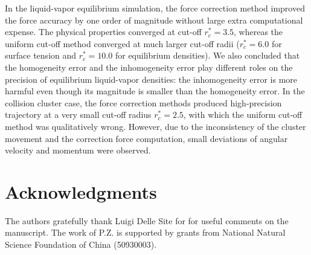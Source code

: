\documentclass[aps,pre,preprint]{revtex4}
\newcommand{\recheck}[1]{{\color{red} #1}}
\begin{document}
In the liquid-vapor equilibrium simulation, the
force correction method improved the force accuracy by one order of
magnitude without large extra computational expense. The physical
properties converged at cut-off $r_c^\ast = 3.5$, whereas the uniform
cut-off method converged at much larger cut-off radii ($r_c^\ast = 6.0$
for surface tension and $r_c^\ast = 10.0$ for equilibrium
densities).
\recheck{
We also concluded that the homogeneity
error and the inhomogeneity error play different roles on the precision
of equilibrium liquid-vapor densities: the inhomogeneity error
is more harmful even though its magnitude is smaller than the homogeneity
error.}
In the collision cluster case,
the force correction methods produced high-precision trajectory at a
very small cut-off radius $r_c^\ast=2.5$, with which the uniform
cut-off method was qualitatively wrong. However, due to the
inconsistency of the cluster movement and the correction force
computation, small deviations of angular velocity and momentum were
observed.



\section*{Acknowledgments}
The authors gratefully thank Luigi Delle Site for for useful comments
on the manuscript. The work of P.Z. is supported by grants from
National Natural Science Foundation of China (50930003).



{}

\end{document}
